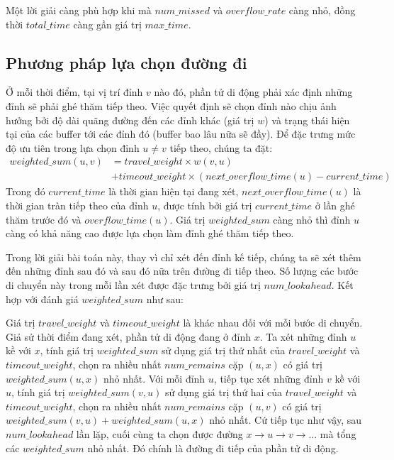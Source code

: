 \documentclass[12pt]{report}
\begin{document}
Một lời giải càng phù hợp khi mà $num\_missed$ và $overflow\_rate$ càng nhỏ, đồng thời $total\_time$ càng gần giá trị $max\_time$.
\subsection{Phương pháp lựa chọn đường đi}
Ở mỗi thời điểm, tại vị trí đỉnh $v$ nào đó, phần tử di động phải xác định những đỉnh sẽ phải ghé thăm tiếp theo. Việc quyết định sẽ chọn đỉnh nào chịu ảnh hưởng bởi độ dài quãng đường đến các đỉnh khác (giá trị $w$) và trạng thái hiện tại của các buffer tới các đỉnh đó (buffer bao lâu nữa sẽ đầy). Để đặc trưng mức độ ưu tiên trong lựa chọn đỉnh $u \neq v$ tiếp theo, chúng ta đặt: 
\begin{equation*}
\begin{split}
weighted\_sum(u, v) & = travel\_weight \times  w(v, u) \\
	& + timeout\_weight \times (next\_overflow\_time(u) - current\_time)
\end{split}
\end{equation*}
Trong đó $current\_time$ là thời gian hiện tại đang xét, $next\_overflow\_time(u)$ là thời gian tràn tiếp theo của đỉnh $u$, được tính bởi giá trị $current\_time$ ở lần ghé thăm trước đó và $overflow\_time(u)$. Giá trị $weighted\_sum$ càng nhỏ thì đỉnh $u$ càng có khả năng cao được lựa chọn làm đỉnh ghé thăm tiếp theo. 

Trong lời giải bài toán này, thay vì chỉ xét đến đỉnh kế tiếp, chúng ta sẽ xét thêm đến những đỉnh sau đó và sau đó nữa trên đường đi tiếp theo. Số lượng các bước di chuyển này trong mỗi lần xét được đặc trưng bởi giá trị $num\_lookahead$. Kết hợp với đánh giá $weighted\_sum$ như sau: 

Giá trị $travel\_weight$ và $timeout\_weight$ là khác nhau đối với mỗi bước di chuyển. Giả sử thời điểm đang xét, phần tử di động đang ở đỉnh $x$. Ta xét những đỉnh $u$ kề với $x$, tính giá trị  $weighted\_sum$ sử dụng giá trị thứ nhất của  $travel\_weight$ và $timeout\_weight$, chọn ra nhiều nhất $num\_remains$ cặp $(u, x)$ có giá trị $weighted\_sum(u, x)$ nhỏ nhất. Với mỗi đỉnh $u$, tiếp tục xét những đỉnh $v$ kề với $u$, tính giá trị  $weighted\_sum(v, u)$ sử dụng giá trị thứ hai của  $travel\_weight$ và $timeout\_weight$, chọn ra nhiều nhất $num\_remains$ cặp $(u, v)$ có giá trị $weighted\_sum(v, u) + weighted\_sum(u, x)$ nhỏ nhất. Cứ tiếp tục như vậy, sau $num\_lookahead$ lần lặp, cuối cùng ta chọn được đường $x \rightarrow u \rightarrow v \rightarrow ...$ mà tổng các $weighted\_sum$ nhỏ nhất. Đó chính là đường đi tiếp của phần tử di động. 
\end{document}
